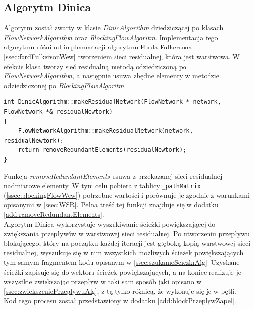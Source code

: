 \subsection{Algorytm Dinica}\label{ssec:dinicAlgWew}
Algorytm został zwarty w klasie \emph{DinicAlgorithm} dziedziczącej po klasach \emph{FlowNetworkAlgorithm} oraz \emph{BlockingFlowAlgoritm}. Implementacja tego algorytmu różni od implementacji algorytmu Forda-Fulkersona \ref{ssec:fordFulkersonWew} tworzeniem sieci residualnej, która jest warstwowa. W efekcie klasa tworzy sieć residualną metodą odziedziczoną po \emph{FlowNetworkAlgorithm}, a następnie usuwa zbędne elementy w metodzie odziedziczonej po \emph{BlockingFlowAlgoritm}.
\begin{verbatim}
int DinicAlgorithm::makeResidualNetwork(FlowNetwork * network, FlowNetwork *& residualNewtork)
{
	FlowNetworkAlgorithm::makeResidualNetwork(network, residualNewtork);
	return removeRedundantElements(residualNewtork);
}
\end{verbatim}
Funkcja \emph{removeRedundantElements} usuwa z przekazanej sieci residualnej nadmiarowe elementy. W tym celu pobiera z tablicy \lstinline{_pathMatrix} (\ref{ssec:blockingFlowWew}) potrzebne wartości i porównuje je zgodnie z  warunkami opisanymi w \ref{ssec:WSR}. Pełna treść tej funkcji znajduje się w dodatku \ref{add:removeRedundantElements}.\\\indent
Algorytm Dinica wykorzystuje wyszukiwanie ścieżki powiększającej do zwiększania przepływów w warstwowej sieci residualnej. Po utworzeniu przepływu blokującego, który na początku każdej iteracji jest głęboką kopią warstwowej sieci residualnej, wyszukuje się w nim wszystkich możliwych ścieżek powiększających tym samym fragmentem kodu opisanym w \ref{ssec:szukanieSciezkiAlg}. Uzyskane ścieżki zapisuje się do wektora ścieżek powiększających, a na koniec realizuje je wszystkie zwiększając przepływ w taki sam sposób jaki opisano w \ref{ssec:zwiekszeniePrzeplywuAlg}, z tą tylko różnicą, że wykonuje się je w pętli. Kod tego procesu został przedstawiony w dodatku \ref{add:blockPrzeplywZapel}.
